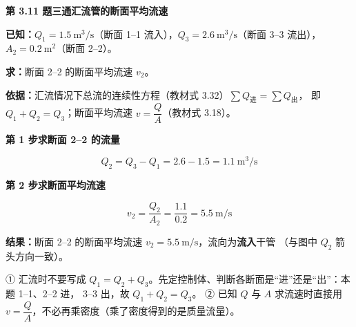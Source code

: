 \noindent\textbf{第 3.11 题\quad 三通汇流管的断面平均流速}

\begin{jie}
\textbf{已知：}$Q_1=1.5\ \mathrm{m^3/s}$（断面 1--1 流入），$Q_3=2.6\ \mathrm{m^3/s}$（断面 3--3 流出），
$A_2=0.2\ \mathrm{m^2}$（断面 2--2）。

\textbf{求：}断面 2--2 的断面平均流速 $v_2$。

\textbf{依据：}汇流情况下总流的连续性方程（教材式 3.32）$\sum Q_{\text{进}}=\sum Q_{\text{出}}$，
即 $Q_1+Q_2=Q_3$；断面平均流速 $v=\dfrac{Q}{A}$（教材式 3.18）。

\textbf{第 1 步\quad 求断面 2--2 的流量}

\[ Q_2=Q_3-Q_1=2.6-1.5=1.1\ \mathrm{m^3/s} \]

\textbf{第 2 步\quad 求断面平均流速}

\[ v_2=\frac{Q_2}{A_2}=\frac{1.1}{0.2}=5.5\ \mathrm{m/s} \]

\textbf{结果：}断面 2--2 的断面平均流速 $v_2=5.5\ \mathrm{m/s}$，流向为\textbf{流入}干管
（与图中 $Q_2$ 箭头方向一致）。
\end{jie}

\begin{yicuo}
① 汇流时不要写成 $Q_1=Q_2+Q_3$。先定控制体、判断各断面是“进”还是“出”：本题 1--1、2--2 进，
3--3 出，故 $Q_1+Q_2=Q_3$。
② 已知 $Q$ 与 $A$ 求流速时直接用 $v=\dfrac{Q}{A}$，不必再乘密度（乘了密度得到的是质量流量）。
\end{yicuo}
